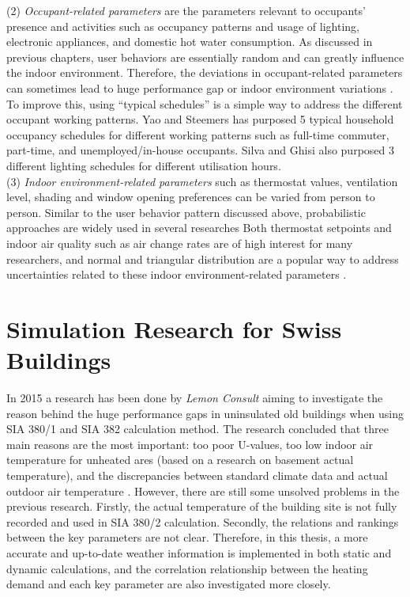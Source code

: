 \documentclass[a4paper, oneside]{discothesis}
\begin{document}
		(2) \textit{Occupant-related parameters} are the parameters relevant to occupants' presence and activities such as occupancy patterns and usage of lighting, electronic appliances, and domestic hot water consumption. As discussed in previous chapters, user behaviors are essentially random and can greatly influence the indoor environment. Therefore, the deviations in occupant-related parameters can sometimes lead to huge performance gap or indoor environment variations \cite{GeorgeThesis}. To improve this, using ``typical schedules'' is a simple way to address the different occupant working patterns. Yao and Steemers \cite{yao2005method} has purposed 5 typical household occupancy schedules for different working patterns such as full-time commuter, part-time, and unemployed/in-house occupants. Silva and Ghisi \cite{silva2014uncertainty} also purposed 3 different lighting schedules for different utilisation hours.\\

		(3) \textit{Indoor environment-related parameters} such as thermostat values, ventilation level, shading and window opening preferences can be varied from person to person. Similar to the user behavior pattern discussed above, probabilistic approaches are widely used in several researches \cite{GeorgeThesis} Both thermostat setpoints and indoor air quality such as air change rates are of high interest for many researchers, and normal and triangular distribution are a popular way to address uncertainties related to these indoor environment-related parameters \cite{GeorgeThesis}. 

	\section{Simulation Research for Swiss Buildings}
		In 2015 a research has been done by \textit{Lemon Consult} \cite{SIAPreviousreport} aiming to investigate the reason behind the huge performance gaps in uninsulated old buildings when using SIA 380/1 and SIA 382 calculation method. The research concluded that three main reasons are the most important: too poor U-values, too low indoor air temperature for unheated ares (based on a research on basement actual temperature), and the discrepancies between standard climate data and actual outdoor air temperature \cite{SIAPreviousreport}. However, there are still some unsolved problems in the previous research. Firstly, the actual temperature of the building site is not fully recorded and used in SIA 380/2 calculation. Secondly, the relations and rankings between the key parameters are not clear. Therefore, in this thesis, a more accurate and up-to-date weather information is implemented in both static and dynamic calculations, and the correlation relationship between the heating demand and each key parameter are also investigated more closely.
\end{document}

